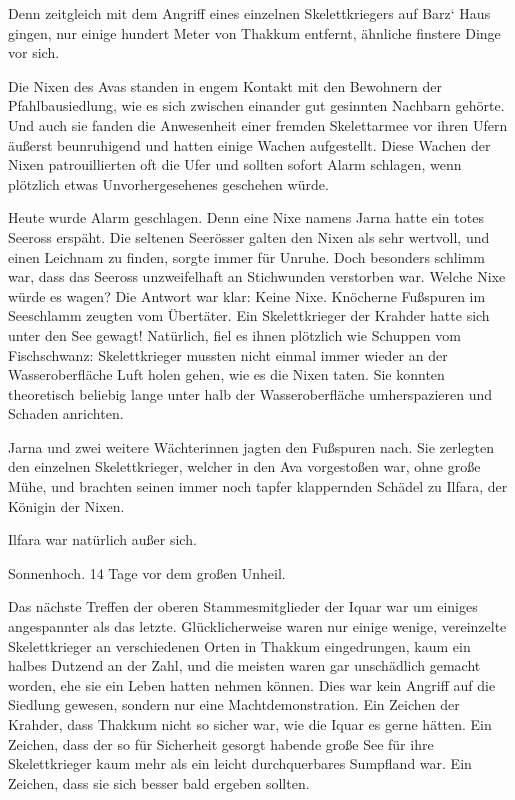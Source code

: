 Denn zeitgleich mit dem Angriff eines einzelnen Skelettkriegers auf Barz‘ Haus gingen, nur einige hundert Meter von Thakkum entfernt, ähnliche finstere Dinge vor sich.

Die Nixen des Avas standen in engem Kontakt mit den Bewohnern der Pfahlbausiedlung, wie es sich zwischen einander gut gesinnten Nachbarn gehörte. Und auch sie fanden die Anwesenheit einer fremden Skelettarmee vor ihren Ufern äußerst beunruhigend und hatten einige Wachen aufgestellt. Diese Wachen der Nixen patrouillierten oft die Ufer und sollten sofort Alarm schlagen, wenn plötzlich etwas Unvorhergesehenes geschehen würde.

Heute wurde Alarm geschlagen. Denn eine Nixe namens Jarna hatte ein totes Seeross erspäht. Die seltenen Seerösser galten den Nixen als sehr wertvoll, und einen Leichnam zu finden, sorgte immer für Unruhe. Doch besonders schlimm war, dass das Seeross unzweifelhaft an Stichwunden verstorben war. Welche Nixe würde es wagen? Die Antwort war klar: Keine Nixe. Knöcherne Fußspuren im Seeschlamm zeugten vom Übertäter. Ein Skelettkrieger der Krahder hatte sich unter den See gewagt! Natürlich, fiel es ihnen plötzlich wie Schuppen vom Fischschwanz: Skelettkrieger mussten nicht einmal immer wieder an der Wasseroberfläche Luft holen gehen, wie es die Nixen taten. Sie konnten theoretisch beliebig lange unter halb der Wasseroberfläche umherspazieren und Schaden anrichten.

Jarna und zwei weitere Wächterinnen jagten den Fußspuren nach. Sie zerlegten den einzelnen Skelettkrieger, welcher in den Ava vorgestoßen war, ohne große Mühe, und brachten seinen immer noch tapfer klappernden Schädel zu Ilfara, der Königin der Nixen.

Ilfara war natürlich außer sich.



\trennzeichen



Sonnenhoch. 14 Tage vor dem großen Unheil.\bigskip



Das nächste Treffen der oberen Stammesmitglieder der Iquar war um einiges angespannter als das letzte. Glücklicherweise waren nur einige wenige, vereinzelte Skelettkrieger an verschiedenen Orten in Thakkum eingedrungen, kaum ein halbes Dutzend an der Zahl, und die meisten waren gar unschädlich gemacht worden, ehe sie ein Leben hatten nehmen können. Dies war kein Angriff auf die Siedlung gewesen, sondern nur eine Machtdemonstration. Ein Zeichen der Krahder, dass Thakkum nicht so sicher war, wie die Iquar es gerne hätten. Ein Zeichen, dass der so für Sicherheit gesorgt habende große See für ihre Skelettkrieger kaum mehr als ein leicht durchquerbares Sumpfland war. Ein Zeichen, dass sie sich besser bald ergeben sollten.

